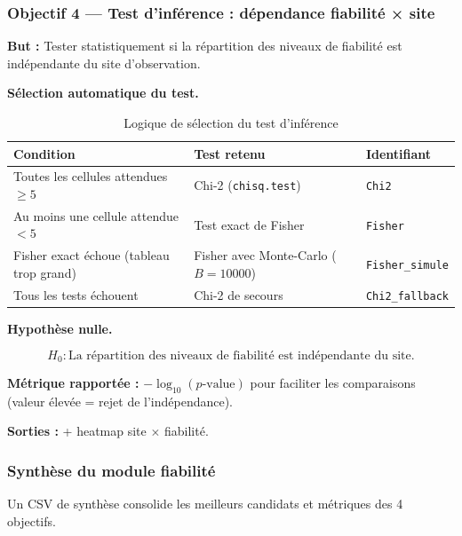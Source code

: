 \documentclass[11pt,a4paper]{article}
\begin{document}
\subsubsection{Objectif 4 — Test d'inférence : dépendance fiabilité × site}

\textbf{But :} Tester statistiquement si la répartition des niveaux de fiabilité est
indépendante du site d'observation.

\medskip
\noindent\textbf{Sélection automatique du test.}\par

\begin{table}[htbp]
  \centering
  \caption{Logique de sélection du test d'inférence}
  \small
  \begin{tabularx}{\textwidth}{Y Y l}
    \toprule
    \textbf{Condition} & \textbf{Test retenu} & \textbf{Identifiant} \\
    \midrule
    Toutes les cellules attendues $\geq 5$ & Chi-2 (\texttt{chisq.test}) & \texttt{Chi2} \\
    Au moins une cellule attendue $< 5$    & Test exact de Fisher      & \texttt{Fisher} \\
    Fisher exact échoue (tableau trop grand) & Fisher avec Monte-Carlo ($B=10000$) & \texttt{Fisher\_simule} \\
    Tous les tests échouent                & Chi-2 de secours          & \texttt{Chi2\_fallback} \\
    \bottomrule
  \end{tabularx}
\end{table}

\medskip
\noindent\textbf{Hypothèse nulle.}\par

\[
  H_0 : \text{La répartition des niveaux de fiabilité est indépendante du site.}
\]

\textbf{Métrique rapportée :} $-\log_{10}(p\text{-value})$ pour faciliter les comparaisons
(valeur élevée = rejet de l'indépendance).

\textbf{Sorties :}  + heatmap site $\times$ fiabilité.

\subsubsection{Synthèse du module fiabilité}

Un CSV de synthèse  consolide les meilleurs
candidats et métriques des 4 objectifs.
\end{document}
